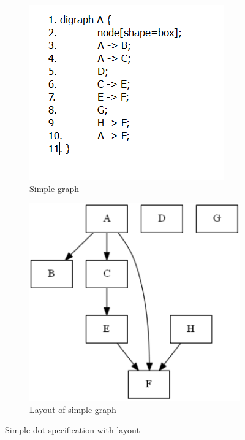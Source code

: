 \begin{figure}
	\centering
    \begin{subfigure}[b]{0.4\linewidth}
    	\includegraphics[width=\linewidth]{GV/gvcode.PNG}
        \caption{Simple graph}
        \label{figure : gv code}
    \end{subfigure}
    \begin{subfigure}[b]{0.4\linewidth}
    	\includegraphics[width=\linewidth]{GV/gv1.PNG}
        \caption{Layout of simple graph}
        \label{figure : gv graph}
    \end{subfigure}
	\caption{Simple dot specification with layout}
    \label{figure : gv simple}
\end{figure}

